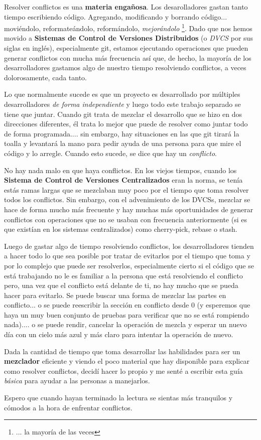 Resolver conflictos es una {\bf materia engañosa}. Los desarolladores gastan tanto tiempo escribiendo código.
Agregando, modificando y borrando código... moviéndolo, reformateándolo, reformándolo, {\it mejorándolo}
\footnote{... la mayoría de las veces}. Dado que nos hemos movido a {\bf Sistemas de Control de Versiones Distribuidos}
(o {\it DVCS} por sus siglas en inglés), especialmente git, estamos ejecutando operaciones que pueden generar conflictos
con mucha más frecuencia así que, de hecho, la mayoría de los desarrolladores gastamos algo de nuestro tiempo resolviendo
conflictos, a veces dolorosamente, cada tanto.

Lo que normalmente sucede es que un proyecto es desarrollado por múltiples desarrolladores {\it de forma independiente}
y luego todo este trabajo separado se tiene que juntar. Cuando git trata de mezclar el desarrollo que se hizo en dos direcciones
diferentes, él trata lo mejor que puede de resolver como juntar todo de forma programada.... sin embargo, hay situaciones en las que
git tirará la toalla y levantará la mano para pedir ayuda de una persona para que mire el código y lo arregle. Cuando esto
sucede, se dice que hay un {\it conflicto}.

No hay nada malo en que haya conflictos. En los viejos tiempos, cuando los {\bf Sistema de Control de Versiones Centralizados} eran la
norma, se tenía estás ramas largas que se mezclaban muy poco por el tiempo que toma resolver todos los conflictos. Sin embargo, con el
advenimiento de los DVCSs, mezclar se hace de forma mucho más frecuente y hay muchas más oportunidades de generar conflictos con
operaciones que no se usaban con frecuencia anteriormente (si es que existían en los sistemas centralizados) como cherry-pick,
rebase o stash.

Luego de gastar algo de tiempo resolviendo conflictos, los desarrolladores tienden a hacer todo lo que sea posible por tratar de
evitarlos por el tiempo que toma y por lo complejo que puede ser resolverlos, especialmente cierto si el código que se está
trabajando no le es familiar a la persona que está resolviendo el conflicto pero, una vez que el conflicto está delante de
ti, no hay mucho que se pueda hacer para evitarlo. Se puede buscar una forma de mezclar las partes en conflicto... o se puede
reescribir la sección en conflicto desde 0 (y esperemos que haya un muy buen conjunto de pruebas para verificar que no se está rompiendo
nada).... o se puede rendir, cancelar la operación de mezcla y esperar un nuevo día con un cielo más azul y más claro para intentar
la operación de nuevo.

Dada la cantidad de tiempo que toma desarrollar las habilidades para ser un {\bf mezclador} eficiente y viendo el poco material
que hay disponible para explicar como resolver conflictos, decidí hacer lo propio y me senté a escribir esta guía
{\it básica} para ayudar a las personas a manejarlos.

Espero que cuando hayan terminado la lectura se sientas más tranquilos y cómodos a la hora de enfrentar conflictos.


